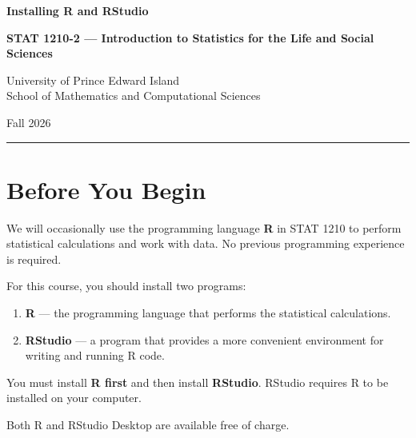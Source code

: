 \documentclass[11pt]{article}
\begin{document}
\begin{center}

{\Large\bfseries Installing R and RStudio}

\vspace{2mm}

{\large\bfseries STAT 1210-2 --- Introduction to Statistics for the Life and Social Sciences}

\vspace{1mm}

{\large University of Prince Edward Island \\ School of Mathematics and Computational Sciences}

\vspace{1mm}

Fall 2026

\end{center}

\vspace{2mm}
\hrule
\vspace{5mm}


\section{Before You Begin}

We will occasionally use the programming language \textbf{R} in STAT 1210 to perform statistical calculations and work with data. No previous programming experience is required.

For this course, you should install two programs:

\begin{enumerate}
    \item \textbf{R} --- the programming language that performs the statistical calculations.
    \item \textbf{RStudio} --- a program that provides a more convenient environment for writing and running R code.
\end{enumerate}

\begin{tcolorbox}[
    colback=CourseLight,
    colframe=CourseBlue,
    title=\textbf{Important}
]
You must install \textbf{R first} and then install \textbf{RStudio}. RStudio requires R to be installed on your computer.
\end{tcolorbox}

Both R and RStudio Desktop are available free of charge.
\end{document}
